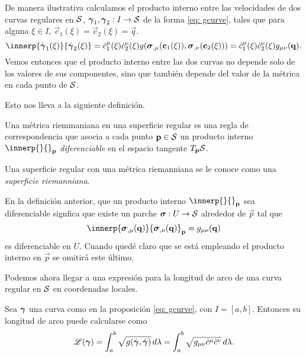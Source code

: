 De manera ilustrativa calculamos el producto interno entre las velocidades de dos curvas regulares en $\mathcal S$, $\boldsymbol{\gamma}_1, \boldsymbol{\gamma}_2 : I \to \mathcal S$ de la forma \eqref{eq: gcurve}, tales que para alguna $\xi \in I$, $\vec c_1(\xi) = \vec c_2(\xi) = \vec q$.
\begin{equation}
	\innerp{\dot\bgamma_1(\xi)}{\dot \bgamma_2(\xi)} = \dot c_1^\mu(\xi) \dot c_2^\nu(\xi) g(\patch_{,\mu}(\vec c_1(\xi)), \patch_{,\nu}(\vec c_2(\xi)))
	= \dot c_1^\mu(\xi) \dot c_2^\nu(\xi) g_{\mu\nu}(\vec q).
\end{equation}
Vemos entonces que el producto interno entre las dos curvas no depende solo de los valores de sus componentes, sino que también depende del valor de la métrica en cada punto de $\mathcal S$.

Esto nos lleva a la siguiente definición.
\begin{definition}
	Una métrica riemmaniana en una superficie regular es una regla de correspondencia que asocia a cada punto $\mathbf p \in \mathcal S$ un producto interno $\innerp{}{}_{\vec p}$ \emph{diferenciable} en el espacio tangente $T_{\mathbf p}\mathcal S$.
	
	Una superficie regular con una métrica riemanniana se le conoce como una \emph{superficie riemanniana}.
\end{definition}
En la definición anterior, que un producto interno $\innerp{}{}_{\vec p}$ sea diferenciable signfica que existe un parche $\boldsymbol{\sigma} : U \to \mathcal S$ alrededor de $\vec p$ tal que
\begin{equation}
	\innerp{\patch_{,\mu}(\vec q)}{\patch_{,\nu}(\vec q)}_{\vec p} = g_{\mu\nu}(\vec q)
\end{equation}
es diferenciable en $U$. Cuando quedé claro que se está empleando el producto interno en $\vec p$ se omitirá este último.

Podemos ahora llegar a una expresión para la longitud de arco de una curva regular en $\mathcal S$ en coordenadas locales.
\begin{remark}
	Sea $\boldsymbol{\gamma}$ una curva como en la proposición \ref{eq: gcurve}, con $I = [a,b]$. Entonces su longitud de arco puede calcularse como
	\begin{equation}\label{eq: surfArc}
		\mathscr L(\boldsymbol{\gamma}) = \int_{a}^{b}\sqrt{g(\dot {\boldsymbol{\gamma}}, \dot {\boldsymbol{\gamma}})} \, d\lambda
		= \int_{a}^{b} \sqrt{
			g_{\mu\nu} \dot c^\mu \dot c^\nu
		}\, d\lambda.
	\end{equation}
\end{remark}


